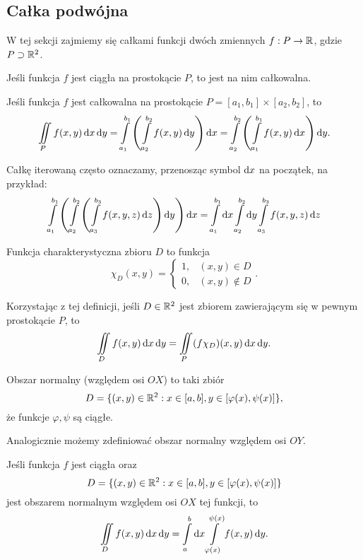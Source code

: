 \subsection{Całka podwójna}
W tej sekcji zajmiemy się całkami funkcji dwóch zmiennych $f : P \to \mathbb R$, gdzie $P \supset \mathbb R^2$.

\begin{theorem}
    Jeśli funkcja $f$ jest ciągła na prostokącie $P$, to jest na nim całkowalna.
\end{theorem}

\begin{theorem}[Fubiniego]
    Jeśli funkcja $f$ jest całkowalna na prostokącie $P = [a_1, b_1] \times [a_2, b_2]$, to
    \[ \iint\limits_P f(x, y) \operatorname{d}\!{x} \operatorname{d}\!{y} = \int\limits_{a_1}^{b_1}\left(\int\limits_{a_2}^{b_2} f(x, y) \operatorname{d}\!{y}\right)\operatorname{d}\!{x} = \int\limits_{a_2}^{b_2}\left(\int\limits_{a_1}^{b_1} f(x, y) \operatorname{d}\!{x}\right)\operatorname{d}\!{y}. \]
\end{theorem}

Całkę iterowaną często oznaczamy, przenosząc symbol $\operatorname{d}\!{x}$ na początek, na przykład:
\[ \int\limits_{a_1}^{b_1} \left(\int\limits_{a_2}^{b_2} \left(\int\limits_{a_3}^{b_3} f(x, y, z) \operatorname{d}\!{z}\right)\operatorname{d}\!{y}\right)\operatorname{d}\!{x} = \int\limits_{a_1}^{b_1} \operatorname{d}\!{x}\int\limits_{a_2}^{b_2} \operatorname{d}\!{y} \int\limits_{a_3}^{b_3} f(x, y, z) \operatorname{d}\!{z} \]

\begin{definition}
    Funkcja charakterystyczna zbioru $D$ to funkcja
    \[ \chi_D(x, y) = \begin{cases}
        1, & (x, y) \in D \\
        0, & (x, y) \notin D
    \end{cases}. \]
\end{definition}

Korzystając z tej definicji, jeśli $D \in \mathbb R^2$ jest zbiorem zawierającym się w pewnym prostokącie $P$, to
\[ \iint\limits_D f(x, y) \operatorname{d}\!{x} \operatorname{d}\!{y} = \iint\limits_P (f\chi_D)(x, y) \operatorname{d}\!{x} \operatorname{d}\!{y}. \]

\begin{definition}
    Obszar normalny (względem osi $OX$) to taki zbiór
    \[ D = \{(x, y) \in \mathbb R^2 : x \in [a, b], y \in [\varphi(x), \psi(x)]\}, \]
    że funkcje $\varphi, \psi$ są ciągłe.
\end{definition}

Analogicznie możemy zdefiniować obszar normalny względem osi $OY$.

\begin{theorem}
    Jeśli funkcja $f$ jest ciągła oraz
    \[ D = \{(x, y) \in \mathbb R^2 : x \in [a, b], y \in [\varphi(x), \psi(x)]\} \]
    jest obszarem normalnym względem osi $OX$ tej funkcji, to
    \[ \iint\limits_D f(x, y) \operatorname{d}\!{x} \operatorname{d}\!{y} = \int\limits_a^b \operatorname{d}\!{x} \int\limits_{\varphi(x)}^{\psi(x)} f(x, y) \operatorname{d}\!{y}. \]
\end{theorem}

